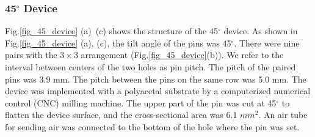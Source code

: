 

\subsubsection{45$^{\circ}$ Device}

Fig.\ref{fig_45_device} (a)~(c) shows the structure of the 45$^{\circ}$ device. 
As shown in Fig.\ref{fig_45_device} (a), (c), the tilt angle of the pins was 45$^{\circ}$. 
There were nine pairs with the $3\times3$ arrangement (Fig.\ref{fig_45_device}(b)).
We refer to the interval between centers of the two holes as pin pitch.
The pitch of the paired pins was 3.9 mm.
The pitch between the pins on the same row was 5.0 mm. 
The device was implemented with a polyacetal substrate by a computerized numerical control (CNC) milling machine.
The upper part of the pin was cut at 45$^{\circ}$ to flatten the device surface, and the cross-sectional area was 6.1 $mm^2$.
An air tube for sending air was connected to the bottom of the hole where the pin was set.


